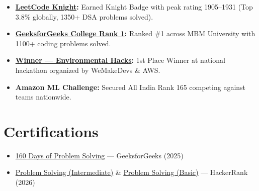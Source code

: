 \documentclass[10pt,a4paper]{article}
\begin{document}
\begin{itemize}
    \item \textbf{\href{https://leetcode.com/u/Harshit_mangal/}{LeetCode Knight}:} Earned Knight Badge with peak rating 1905--1931 (Top 3.8\% globally, 1350+ DSA problems solved).
    \item \textbf{\href{https://auth.geeksforgeeks.org/user/harshitmangal}{GeeksforGeeks College Rank 1}:} Ranked \#1 across MBM University with 1100+ coding problems solved.
    \item \textbf{\href{https://www.wemakedevs.org/certificates/VA2N7YMWDX}{Winner --- Environmental Hacks}:} 1st Place Winner at national hackathon organized by WeMakeDevs \& AWS.
    \item \textbf{Amazon ML Challenge:} Secured All India Rank 165 competing against teams nationwide.
\end{itemize}

\section*{Certifications}

\begin{itemize}
    \item \href{https://media.geeksforgeeks.org/courses/certificates/22a599fc4a5676f802aa4a2ee4cc3c7f.pdf}{160 Days of Problem Solving} --- GeeksforGeeks (2025)
    \item \href{https://www.hackerrank.com/certificates/227251652361}{Problem Solving (Intermediate)} \& \href{https://www.hackerrank.com/certificates/9fe36f33fe64}{Problem Solving (Basic)} --- HackerRank (2026)
\end{itemize}
\end{document}
